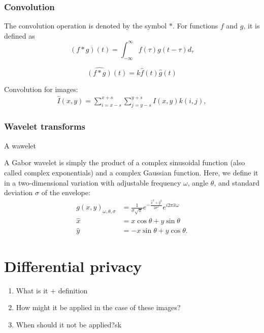 \subsubsection{Convolution}

\begin{definition}[Convolution]
The convolution operation is denoted by the symbol $*$. For functions $f$ and $g$, it is defined as 
\begin{equation}
    (f*g)(t) = \int_{-\infty}^\infty f(\tau)g(t-\tau)d_\tau
\end{equation}
\end{definition}

\begin{equation}
    \widehat{(f*g)}(t) = k\hat{f}(t)\hat{g}(t)
\end{equation}

Convolution for images:
\begin{align}
    \hat{I}(x, y) = \sum_{i=x-s}^{x+s}\sum_{j=y-s}^{y+s} I(x,y)k(i,j),
\end{align}

\subsubsection{Wavelet transforms}
A wawelet 

A Gabor wavelet is simply the product of a complex sinusoidal function (also called complex exponentials) and a complex Gaussian function. Here, we define it in a two-dimensional variation with adjustable frequency $\omega$, angle $\theta$, and standard deviation $\sigma$ of the envelope:
\begin{align}
    g(x,y)_{\omega, \theta, \sigma} &= \frac{1}{\sigma\sqrt{\pi}} e^{-\frac{\hat{x}^2+\hat{y}^2}{2\sigma^2}} e^{i 2\pi \hat{x}\omega}\\
    \hat{x} &= x\cos\theta + y\sin\theta \\
    \hat{y} &= -x\sin\theta + y\cos\theta.
\end{align}


\section{Differential privacy}

\begin{enumerate}
    \item What is it + definition
    \item How might it be applied in the case of these images?
    \item When should it not be applied?sk
\end{enumerate}